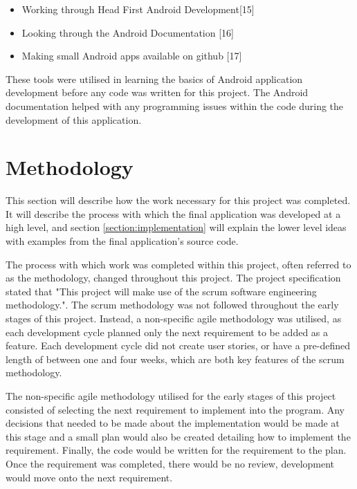 \documentclass{article}
\begin{document}
\begin{itemize}
	\item Working through Head First Android Development[15]
	\item Looking through the Android Documentation [16]
	\item Making small Android apps available on github [17]
\end{itemize}

These tools were utilised in learning the basics of Android application development before any code was written for this project. The Android documentation helped with any programming issues within the code during the development of this application. 

\section{Methodology}
\label{section:methodology}

This section will describe how the work necessary for this project was completed. It will describe the process with which the final application was developed at a high level, and section \ref{section:implementation} will explain the lower level ideas with examples from the final application's source code. \par

The process with which work was completed within this project, often referred to as the methodology, changed throughout this project. The project specification stated that "This project will make use of the scrum software engineering methodology.". The scrum methodology was not followed throughout the early stages of this project. Instead, a non-specific agile methodology was utilised, as each development cycle planned only the next requirement to be added as a feature. Each development cycle did not create user stories, or have a pre-defined length of between one and four weeks, which are both key features of the scrum methodology. \par

The non-specific agile methodology utilised for the early stages of this project consisted of selecting the next requirement to implement into the program. Any decisions that needed to be made about the implementation would be made at this stage and a small plan would also be created detailing how to implement the requirement. Finally, the code would be written for the requirement to the plan. Once the requirement was completed, there would be no review, development would move onto the next requirement. \par
\end{document}
